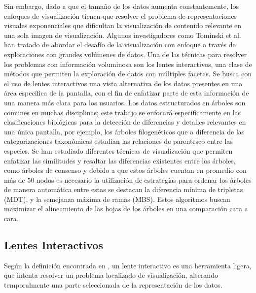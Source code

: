 \documentclass[journal]{IEEEtran}
\begin{document}
 Sin embargo, dado a que el tamaño de los datos aumenta constantemente,
  los enfoques de visualización tienen que resolver el problema de representaciones visuales 
  exponenciales que dificultan la visualización de contenido relevante en una sola imagen de visualización\cite{tominski_gladisch_kister_dachselt_schumann_2016}.
Algunos investigadores como Tominski et al. han tratado de abordar el desafío de la visualización con enfoque a través de exploraciones con grandes volúmenes 
de datos. Una de las técnicas para resolver los problemas con información voluminosa son los lentes interactivos,
 una clase de métodos que permiten la exploración de datos con múltiples facetas. 
 Se busca con el uso de lentes interactivos una vista alternativa de los datos presentes en una área 
 específica de la pantalla, con el fin de enfatizar parte de esta información de una manera más clara para los usuarios\cite{tominski_gladisch_kister_dachselt_schumann_2016}.
Los datos estructurados en árboles son comunes en muchas disciplinas; este trabajo se enfocará 
específicamente en las clasificaciones biológicas para la detección de diferencias y detalles relevantes 
en una única pantalla, por ejemplo, los árboles filogenéticos que a diferencia de las categorizaciones 
taxonómicas estudian las relaciones de parentesco entre las especies.
Se han estudiado diferentes técnicas de visualización que permiten enfatizar las similitudes 
y resaltar las diferencias existentes entre los árboles, como árboles de consenso\cite{inproceedings} y debido a que estos 
árboles cuentan en promedio con más de 50 nodos es necesario la utilización de estrategias para ordenar 
los árboles de manera automática entre estas se destacan la diferencia mínima de tripletas (MDT), y la
 semejanza máxima de ramas (MBS). Estos algoritmos buscan maximizar el alineamiento de las hojas de los 
 árboles en una comparación cara a cara\cite{inproceedings}.


 \subsection{Lentes Interactivos}

 Según la definición encontrada en \cite{tominski_gladisch_kister_dachselt_schumann_2016}, un lente interactivo es una herramienta ligera, que
 intenta resolver un problema localizado de visualización, alterando temporalmente una parte seleccionada de la representación de los datos.
\end{document}
